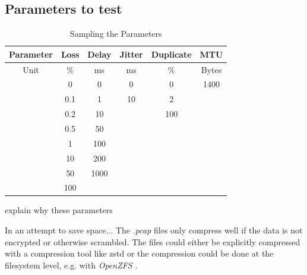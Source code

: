 \subsection{Parameters to test}
\begin{table}[]
	\centering
	\footnotesize
	\begin{tabular}{cccccc}
		\toprule
		\textbf{Parameter} & \textbf{Loss} & \textbf{Delay} & \textbf{Jitter} & \textbf{Duplicate} & \textbf{MTU} \\ \midrule
		\rowcolor[HTML]{EFEFEF}
		Unit               & \%            & ms             & ms              & \%                 & Bytes        \\
		& 0             & 0              & 0               & 0                  & 1400         \\
		\rowcolor[HTML]{EFEFEF}
		& 0.1           & 1              & 10              & 2                  &              \\
		& 0.2           & 10             &                 & 100                &              \\
		\rowcolor[HTML]{EFEFEF}
		& 0.5           & 50             &                 &                    &              \\
		& 1             & 100            &                 &                    &              \\
		\rowcolor[HTML]{EFEFEF}
		& 10            & 200            &                 &                    &              \\
		& 50            & 1000           &                 &                    &              \\
		\rowcolor[HTML]{EFEFEF}
		& 100           &                &                 &                    &              \\ \bottomrule
	\end{tabular}
	\caption{Sampling the Parameters}
	\label{tab:parameters}
\end{table}
explain why these parameters







In an attempt to save space...
The \textit{.pcap} \cite{wiki:Pcap} files only compress well if the data is not encrypted or otherwise scrambled.
The files could either be explicitly compressed with a compression tool like zstd or the compression could be done at the filesystem level, e.g. with \textit{OpenZFS} \cite{OpenZFS}. 


